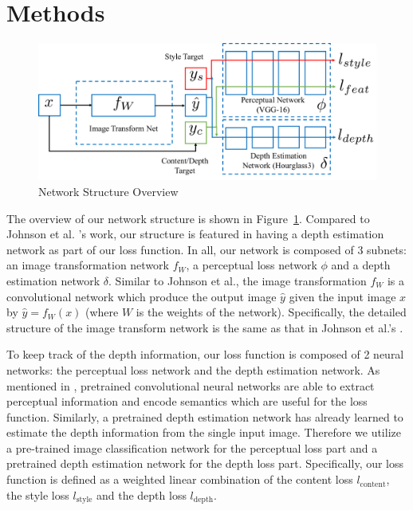 \documentclass[10pt,twocolumn,letterpaper]{article}
\begin{document}
\section{Methods}

\begin{figure}[h]
\centering
\includegraphics[scale=0.4]{network_structure.pdf}
\caption{Network Structure Overview}
\label{fig:overview}
\end{figure}

The overview of our network structure is shown in Figure~\ref{fig:overview}. Compared to Johnson et al. \cite{johnson2016perceptual}'s work, our structure is featured in having a depth estimation network as part of our loss function. In all, our network is composed of 3 subnets: an image transformation network $f_W$, a perceptual loss network $\phi$ and a depth estimation network $\delta$. Similar to Johnson et al., the image transformation $f_W$ is a convolutional network which produce the output image $\hat y$ given the input image $x$ by $\hat y = f_W(x)$ (where $W$ is the weights of the network). Specifically, the detailed structure of the image transform network is the same as that in Johnson et al.'s \cite{johnson2016perceptual}.

To keep track of the depth information, our loss function is composed of 2 neural networks: the perceptual loss network and the depth estimation network. As mentioned in \cite{johnson2016perceptual}, pretrained convolutional neural networks are able to extract perceptual information and encode semantics which are useful for the loss function. Similarly, a pretrained depth estimation network has already learned to estimate the depth information from the single input image. Therefore we utilize a pre-trained image classification network for the perceptual loss part and a pretrained depth estimation network for the depth loss part. Specifically, our loss function is defined as a weighted linear combination of the content loss $l_\text{content}$, the style loss $l_\text{style}$ and the depth loss $l_\text{depth}$. 
\end{document}
